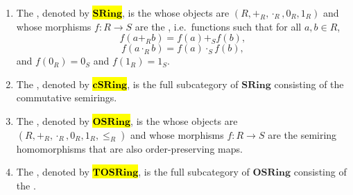 \begin{definition} \label{definition:category_of_semirings_and_ordered_semirings}
    \begin{enumerate}
        \item The , denoted by \hl{$\mathbf{SRing}$}, is the   whose objects are  $(R, +_R, \cdot_R, 0_R, 1_R)$ and whose morphisms $f : R \to S$ are the , i.e.\ functions such that for all $a, b \in R$,
        $$f(a +_R b) = f(a) +_S f(b),$$
        $$f(a \cdot_R b) = f(a) \cdot_S f(b),$$
        and $f(0_R) = 0_S$ and $f(1_R) = 1_S$.

        \item The , denoted by \hl{$\mathbf{cSRing}$}, is the full subcategory of $\mathbf{SRing}$ consisting of the commutative semirings.

        \item The , denoted by \hl{$\mathbf{OSRing}$}, is the   whose objects are  $(R, +_R, \cdot_R, 0_R, 1_R, \leq_R)$ and whose morphisms $f : R \to S$ are the semiring homomorphisms that are also order-preserving maps.

        \item The , denoted by \hl{$\mathbf{TOSRing}$}, is the full subcategory of $\mathbf{OSRing}$ consisting of the .
    \end{enumerate}
\end{definition}
